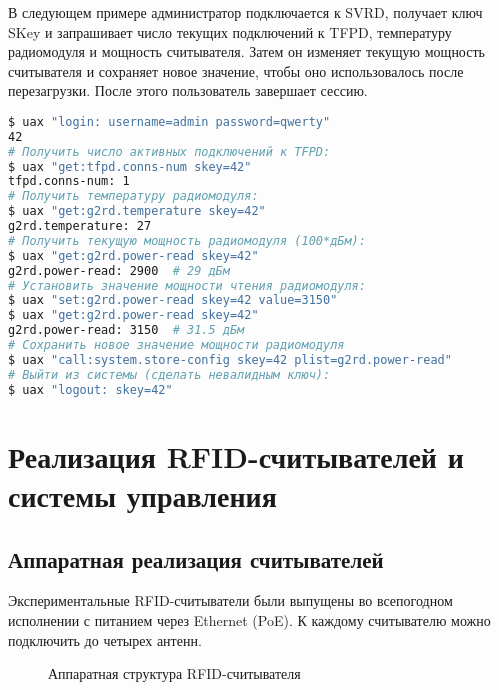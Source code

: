 В следующем примере администратор подключается к SVRD, получает ключ SKey и запрашивает число текущих подключений к TFPD, температуру радиомодуля и мощность считывателя. Затем он изменяет текущую мощность считывателя и сохраняет новое значение, чтобы оно использовалось после перезагрузки. После этого пользователь завершает сессию.

\begin{lstlisting}[language=Bash]
$ uax "login: username=admin password=qwerty"
42
# Получить число активных подключений к TFPD:
$ uax "get:tfpd.conns-num skey=42"
tfpd.conns-num: 1
# Получить температуру радиомодуля:
$ uax "get:g2rd.temperature skey=42"
g2rd.temperature: 27
# Получить текущую мощность радиомодуля (100*дБм):
$ uax "get:g2rd.power-read skey=42"
g2rd.power-read: 2900  # 29 дБм
# Установить значение мощности чтения радиомодуля:
$ uax "set:g2rd.power-read skey=42 value=3150"
$ uax "get:g2rd.power-read skey=42"
g2rd.power-read: 3150  # 31.5 дБм
# Сохранить новое значение мощности радиомодуля
$ uax "call:system.store-config skey=42 plist=g2rd.power-read"
# Выйти из системы (сделать невалидным ключ):
$ uax "logout: skey=42"
\end{lstlisting}



\section{Реализация RFID-считывателей и системы управления}\label{sec:ch5_implementation}

\subsection{Аппаратная реализация считывателей}\label{sec:ch5_implementation_hardware}
Экспериментальные RFID-считыватели были выпущены во всепогодном исполнении с питанием через Ethernet (PoE). К каждому считывателю можно подключить до четырех антенн.

\begin{figure}[ht]
  \caption{Аппаратная структура RFID-считывателя}
  \label{fig:ch5_reader_hardware}
\end{figure}

